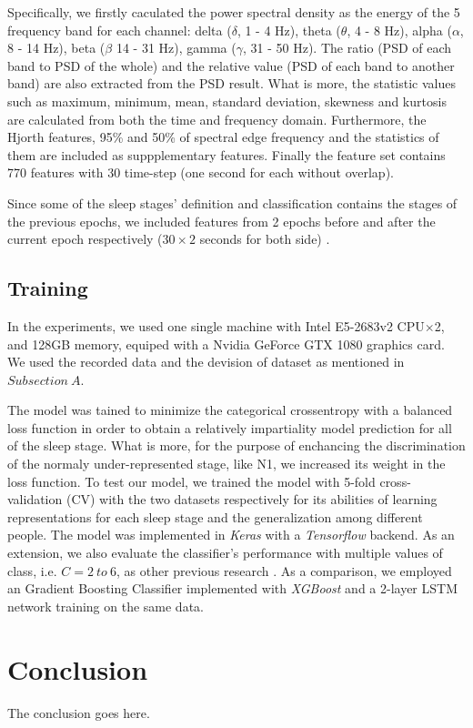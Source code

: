 \documentclass[journal]{IEEEtran}
\begin{document}
Specifically, we firstly caculated the power spectral density as the energy of the 5 frequency band for each channel: delta ($\delta$, 1 - 4 Hz), theta ($\theta$, 4 - 8 Hz), alpha ($\alpha$, 8 - 14 Hz), beta ($\beta$ 14 - 31 Hz), gamma ($\gamma$, 31 - 50 Hz). The ratio (PSD of each band to PSD of the whole) and the relative value (PSD of each band to another band) are also extracted from the PSD result. What is more, the statistic values such as maximum, minimum, mean, standard deviation, skewness and kurtosis are calculated from both the time and frequency domain. Furthermore, the Hjorth features, 95\% and 50\% of spectral edge frequency and the statistics of them are included as suppplementary features. Finally the feature set contains 770 features with 30 time-step (one second for each without overlap).

Since some of the sleep stages' definition and classification contains the stages of the previous epochs, we included features from 2 epochs before and after the current epoch respectively ($30\times 2$ seconds for both side) \cite{chambon2017deep}.
\subsection{Training}
In the experiments, we used one single machine with Intel E5-2683v2 CPU$\times$2, and 128GB memory, equiped with a Nvidia GeForce GTX 1080 graphics card. We used the recorded data and the devision of dataset as mentioned in $Subsection\ A$. 

The model was tained to minimize the categorical crossentropy with a balanced loss function in order to obtain a relatively impartiality model prediction for all of the sleep stage. What is more, for the purpose of enchancing the discrimination of the normaly under-represented stage, like N1, we increased its weight in the loss function. To test our model, we trained the model with 5-fold cross-validation (CV) with the two datasets respectively for its abilities of learning representations for each sleep stage and the generalization among different people. The model was implemented in \emph{Keras} with a \emph{Tensorflow} backend. As an extension, we also evaluate the classifier's performance with multiple values of class, i.e. $C = 2\ to\ 6$, as other previous research \cite{nakamura2017complexity}. As a comparison, we employed an Gradient Boosting Classifier implemented with \emph{XGBoost} \cite{Chen2016XGBoost} and a 2-layer LSTM network training on the same data.


\section{Conclusion}
The conclusion goes here.
\end{document}
